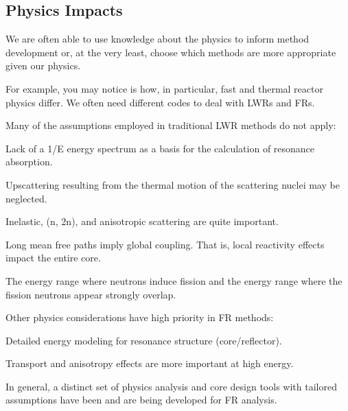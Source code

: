 \documentclass[12pt]{article}
\begin{document}
\pagebreak
\subsection*{Physics Impacts}

We are often able to use knowledge about the physics to inform method 
development or, at the very least, choose which methods are more appropriate 
given our physics. 

For example, you may notice is how, in particular, fast and thermal reactor 
physics differ. We often need different codes to deal with LWRs and FRs. 

Many of the assumptions employed in traditional LWR methods do not apply:

\begin{compactitem}
\item Lack of a 1/E energy spectrum as a basis for the calculation of 
      resonance absorption.
\item Upscattering resulting from the thermal motion of the scattering nuclei 
      may be neglected.
\item Inelastic, (n, 2n), and anisotropic scattering are quite important.
\item Long mean free paths imply global coupling. That is, local reactivity 
      effects impact the entire core.  
\item The energy range where neutrons induce fission and the energy range 
      where the fission neutrons appear strongly overlap.
\end{compactitem}

Other physics considerations have high priority in FR methods:

\begin{compactitem}
\item Detailed energy modeling for resonance structure (core/reflector).
\item Transport and anisotropy effects are more important at high energy.
\end{compactitem}

In general, a distinct set of physics analysis and core design tools with 
tailored assumptions have been and are being developed for FR analysis.
\end{document}

